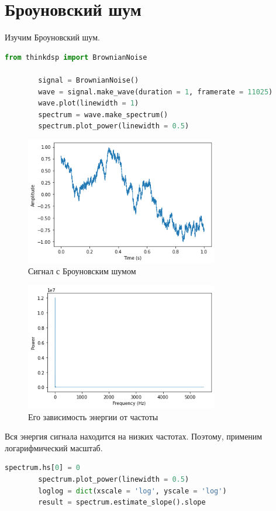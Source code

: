 \documentclass[a4paper, 12pt]{report}
\begin{document}
	\chapter{Броуновский шум}
	Изучим Броуновский шум.
	\begin{lstlisting}[language=Python,caption=Построение сигнала с Броуновским шумом]
		from thinkdsp import BrownianNoise

		signal = BrownianNoise()
		wave = signal.make_wave(duration = 1, framerate = 11025)
		wave.plot(linewidth = 1)
		spectrum = wave.make_spectrum()
		spectrum.plot_power(linewidth = 0.5)
	\end{lstlisting}
	\begin{figure}[H]
		\centering
		\includegraphics[width=0.75\textwidth]{br1.png}
		\caption{Сигнал с Броуновским шумом}
		\label{fig:br1}
	\end{figure}
	\begin{figure}[H]
		\centering
		\includegraphics[width=0.75\textwidth]{br2.png}
		\caption{Его зависимость энергии от частоты}
		\label{fig:br2}
	\end{figure}
	Вся энергия сигнала находится на низких частотах. Поэтому, применим логарифмический масштаб.
	\begin{lstlisting}[language=Python,caption=Cигнал с Броуновским шумом в логарифмическом масштабе]
		spectrum.hs[0] = 0
		spectrum.plot_power(linewidth = 0.5)
		loglog = dict(xscale = 'log', yscale = 'log')
		result = spectrum.estimate_slope().slope
	\end{lstlisting}
\end{document}

